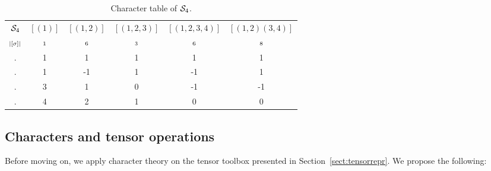 \begin{table}[hbt!]
		\centering
		\begin{tabular}{c | c c c c c}
			  $\mathcal{S}_4$   & $[(1)]$ & $[(1,2)]$ & $[(1,2,3)]$ & $[(1,2,3,4)]$ & $[(1,2)(3,4)]$ \\
			 $\scriptstyle|[\sigma]|$ & $\scriptstyle1$       & $\scriptstyle6$         & $\scriptstyle3$           & $\scriptstyle6$             & $\scriptstyle8$              \\ \hline
			   \Triv.    & 1       & 1         & 1           & 1             & 1              \\
			   \Alt.     & 1       & -1        & 1           & -1            & 1              \\
			   \Stan.    & 3       & 1         & 0           & -1            & -1             \\
			   \Perm.    & 4       & 2         & 1           & 0             & 0              \\ %
		\end{tabular}
		\caption{Character table of $\mathcal{S}_4$.}
		\label{table:chartableSym4}
\end{table}


\subsection{Characters and tensor operations}

Before moving on, we apply character theory on the tensor toolbox presented in Section~\ref{sect:tensorrepr}. We propose the following:

